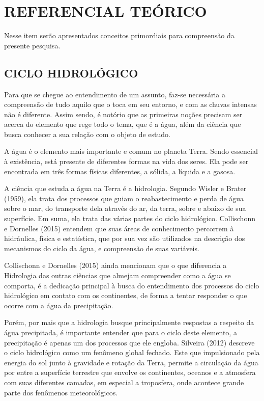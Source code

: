 \chapter{REFERENCIAL TEÓRICO}
\onehalfspacing
Nesse item serão apresentados conceitos primordiais para compreensão da presente pesquisa. 

\section{CICLO HIDROLÓGICO}

Para que se chegue ao entendimento de um assunto, faz-se necessária a compreensão de tudo aquilo que o toca em seu entorno, e com as chuvas intensas não é diferente. Assim sendo, é notório que as primeiras noções precisam ser acerca do elemento que rege todo o tema, que é a água, além da ciência que busca conhecer a sua relação com o objeto de estudo.

A água é o elemento mais importante e comum no planeta Terra. Sendo essencial à existência, está presente de diferentes formas na vida dos seres. Ela pode ser encontrada em três formas físicas diferentes, a sólida, a líquida e a gasosa. 

A ciência que estuda a água na Terra é a hidrologia. Segundo Wisler e Brater (1959), ela trata dos processos que guiam o reabastecimento e perda de água sobre o mar, do transporte dela através do ar, da terra, sobre e abaixo de sua superfície. Em suma, ela trata das várias partes do ciclo hidrológico. Collischonn e Dornelles (2015) entendem que suas áreas de conhecimento percorrem à hidráulica, física e estatística, que por sua vez são utilizados na descrição dos mecanismos do ciclo da água, e compreensão de suas variáveis.

Collischonn e Dornelles (2015) ainda mencionam que o que diferencia a Hidrologia das outras ciências que almejam compreender como a água se comporta, é a dedicação principal à busca do entendimento dos processos do ciclo hidrológico em contato com os continentes, de forma a tentar responder o que ocorre com a água da precipitação.

Porém, por mais que a hidrologia busque principalmente respostas a respeito da água precipitada, é importante entender que para o ciclo deste elemento, a precipitação é apenas um dos processos que ele engloba. Silveira (2012) descreve o ciclo hidrológico como um fenômeno global fechado. Este que impulsionado pela energia do sol junto à gravidade e rotação da Terra, permite a circulação da água por entre a superfície terrestre que envolve os continentes, oceanos e a atmosfera com suas diferentes camadas, em especial a troposfera, onde acontece grande parte dos fenômenos meteorológicos.

